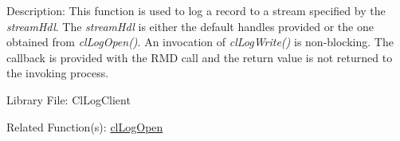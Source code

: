 \begin{Desc}
\item[Description:]This function is used to log a record to a stream specified by the {\em stream\-Hdl\/}. The {\em stream\-Hdl\/} is either the default
handles provided or the one obtained from \textit{clLogOpen()}. An invocation of \textit{clLogWrite()} is non-blocking. The callback is provided with the RMD call and the return value is not returned to the invoking process.\end{Desc}
\begin{Desc}
\item[Library File:]Cl\-Log\-Client\end{Desc}
\begin{Desc}
\item[Related Function(s):]\hyperlink{pagelog105}{cl\-Log\-Open} \end{Desc}
\newpage

